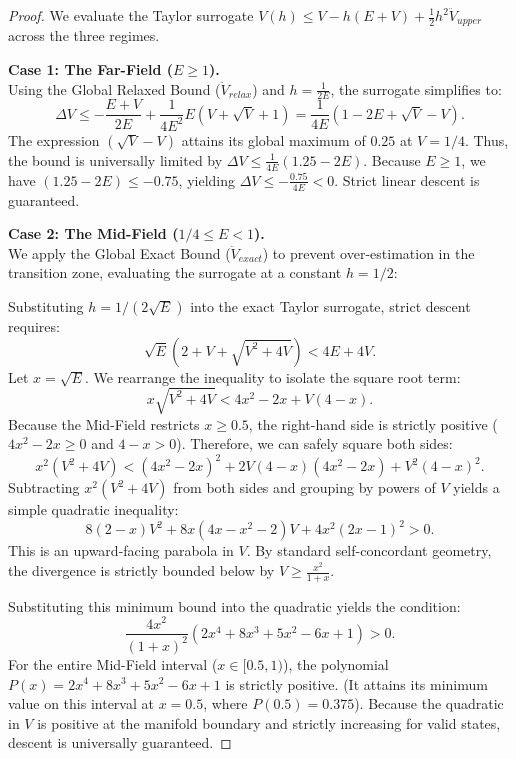 \begin{proof}
We evaluate the Taylor surrogate $V(h) \le V - h(E+V) + \frac{1}{2}h^2 \ddot{V}_{upper}$ across the three regimes.

\textbf{Case 1: The Far-Field ($E \ge 1$).} \\
Using the Global Relaxed Bound ($\ddot{V}_{relax}$) and $h = \frac{1}{2E}$, the surrogate simplifies to:
\begin{equation}
    \Delta V \le -\frac{E+V}{2E} + \frac{1}{4E^2} E(V + \sqrt{V} + 1) = \frac{1}{4E}\left( 1 - 2E + \sqrt{V} - V \right).
\end{equation}
The expression $(\sqrt{V} - V)$ attains its global maximum of $0.25$ at $V = 1/4$. Thus, the bound is universally limited by $\Delta V \le \frac{1}{4E}(1.25 - 2E)$. Because $E \ge 1$, we have $(1.25 - 2E) \le -0.75$, yielding $\Delta V \le -\frac{0.75}{4E} < 0$. Strict linear descent is guaranteed.

\textbf{Case 2: The Mid-Field ($1/4 \le E < 1$).} \\
We apply the Global Exact Bound ($\ddot{V}_{exact}$) to prevent over-estimation in the transition zone, evaluating the surrogate at a constant $h = 1/2$:

Substituting $h = 1/(2\sqrt{E})$ into the exact Taylor surrogate, strict descent requires:
\begin{equation}
    \sqrt{E}(2 + V + \sqrt{V^2 + 4V}) < 4E + 4V.
\end{equation}
Let $x = \sqrt{E}$. We rearrange the inequality to isolate the square root term:
\begin{equation}
    x\sqrt{V^2 + 4V} < 4x^2 - 2x + V(4-x).
\end{equation}
Because the Mid-Field restricts $x \ge 0.5$, the right-hand side is strictly positive ($4x^2 - 2x \ge 0$ and $4-x > 0$). Therefore, we can safely square both sides:
\begin{equation}
    x^2(V^2 + 4V) < (4x^2 - 2x)^2 + 2V(4-x)(4x^2 - 2x) + V^2(4-x)^2.
\end{equation}
Subtracting $x^2(V^2 + 4V)$ from both sides and grouping by powers of $V$ yields a simple quadratic inequality:
\begin{equation}
    8(2-x)V^2 + 8x(4x - x^2 - 2)V + 4x^2(2x-1)^2 > 0.
\end{equation}
This is an upward-facing parabola in $V$. By standard self-concordant geometry, the divergence is strictly bounded below by $V \ge \frac{x^2}{1+x}$. 

Substituting this minimum bound into the quadratic yields the condition:
\begin{equation}
    \frac{4x^2}{(1+x)^2} \left( 2x^4 + 8x^3 + 5x^2 - 6x + 1 \right) > 0.
\end{equation}
For the entire Mid-Field interval ($x \in [0.5, 1)$), the polynomial $P(x) = 2x^4 + 8x^3 + 5x^2 - 6x + 1$ is strictly positive. (It attains its minimum value on this interval at $x=0.5$, where $P(0.5) = 0.375$). Because the quadratic in $V$ is positive at the manifold boundary and strictly increasing for valid states, descent is universally guaranteed.



\end{proof}
